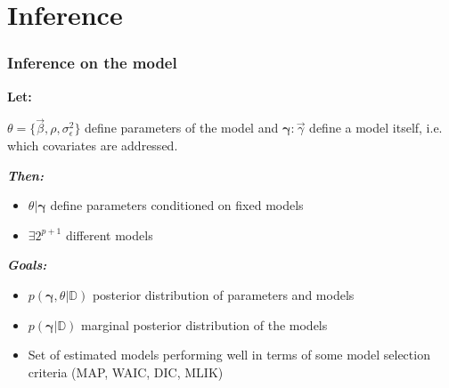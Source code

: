 \documentclass{beamer}
\newcommand{\jwidth}{\righthyphenmin=20 \justifying}
\begin{document}
\section{Inference} 

\begin{frame}

\frametitle{Inference on the model}

\begin{center}
\textbf{ Let:}
 \end{center} 
 
 $\theta = \{\vec{\beta},\rho,\sigma^2_{\epsilon}\}$ define parameters of the model and $\boldsymbol{\gamma}:\vec{\gamma} $ define a model itself, i.e. which covariates are addressed.
 
\begin{center}
\textit{\emph{\textbf{Then:}}}
\end{center}
\begin{itemize}
\item \jwidth $\theta|\boldsymbol{\gamma}$ define parameters conditioned on fixed models 
\item \jwidth $\exists  2^{p+1}$ different models
\end{itemize}
\begin{center}
\textit{\emph{\textbf{Goals:}}}
\end{center}
\begin{itemize}
\item \jwidth $p(\boldsymbol{\gamma},\theta|\mathbb{D})$ posterior distribution of parameters and models
\item \jwidth $p(\boldsymbol{\gamma}|\mathbb{D})$ marginal posterior distribution of the models
\item \jwidth Set of estimated models performing well in terms of some model selection criteria (MAP, WAIC, DIC, MLIK)
\end{itemize}
\end{frame}
\end{document}
